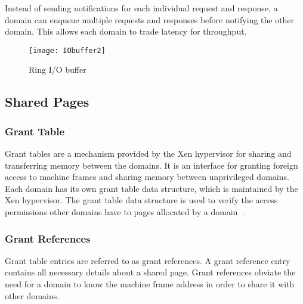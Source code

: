 Instead of sending notifications for each individual request and response,
a domain can enqueue multiple requests and responses before notifying
the other domain. This allows each domain to trade latency for throughput.

\begin{figure}[!ht]
\centering
\texttt{[image: IObuffer2]}
\caption{Ring I/O buffer}
\label{fig:Ring buffer}
\end{figure}

\subsection*{Shared Pages}
\label{subsec:sharedpages}
\subsubsection*{Grant Table} 

Grant tables are a mechanism provided by the Xen hypervisor for sharing
and transferring memory between the domains. It is an interface for
granting foreign access to machine frames and sharing memory between
unprivileged domains. Each domain has its own grant table data structure,
which is maintained by the Xen hypervisor. The grant table data structure
is used to verify the access permissions other domains have to pages
allocated by a domain~\cite{granttable}.

\subsubsection*{Grant References}

Grant table entries are referred to as grant references. A grant reference
entry contains all necessary details about a shared page.
Grant references obviate the need for a domain to know the machine
frame address in order to share it with other 
domains.\cite{Chisnall:2007:DGX:1407351,barham2003xen,granttable}

